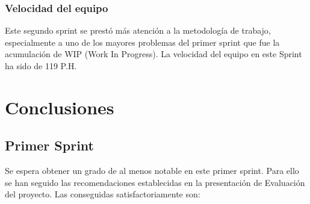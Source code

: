 \documentclass[11pt,a4paper]{report}
\begin{document}
\subsection{Velocidad del equipo}
Este segundo sprint se prestó más atención a la metodología de trabajo, especialmente a uno de los mayores problemas del primer sprint que fue la acumulación de WIP (Work In Progress). La velocidad del equipo en este Sprint ha sido de 119 P.H.
\chapter{Conclusiones}
\section{Primer Sprint}
Se espera obtener un grado de al menos notable en este primer sprint. Para ello se han seguido las recomendaciones establecidas en la presentación de Evaluación del proyecto. Las conseguidas satisfactoriamente son:
\end{document}
